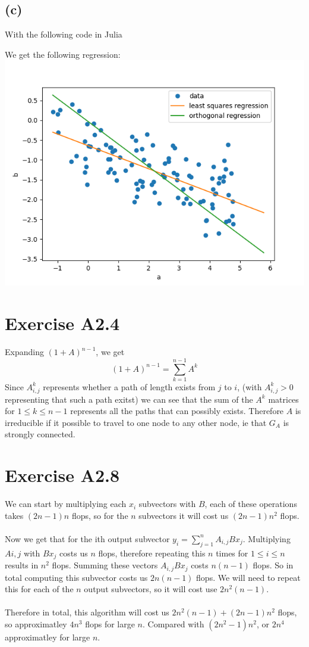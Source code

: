 \subsection*{(c)}
With the following code in Julia 

We get the following regression:\\
\includegraphics[scale=0.5]{test.png}
\section*{Exercise A2.4}
Expanding $(1+A)^{n-1}$, we get
$$
(1+A)^{n-1}=\sum_{k=1}^{n-1}A^k$$
Since $A^k_{i,j}$ represents whether a path of length exists from $j$ to $i$, (with $A^k_{i,j}>0$ representing that such a path exitst)
we can see that the sum of the $A^k$ matrices for $1\leq k \leq n-1$ represents all the paths that can possibly exists. Therefore $A$ is
irreducible if it possible to travel to one node to any other node, ie that $G_A$ is strongly connected.
\section*{Exercise A2.8}
We can start by multiplying each $x_i$ subvectors with $B$, each of these operations takes $(2n-1)n$ flops, so for the $n$ subvectors it will cost us $(2n-1)n^2$ flops.
\\\\Now we get that for the ith output subvector $y_i=\sum_{j=1}^{n}A_{i,j}Bx_j$. Multiplying $A{i,j}$ with $Bx_j$ costs us $n$ flops, therefore repeating this $n$ times for 
$1\leq i \leq n$ results in $n^2$ flops. Summing these vectors $A_{i,j}Bx_j$ costs $n(n-1)$ flops. So in total computing this subvector costs us $2n(n-1)$ flops. We will need to repeat this for each of the $n$ output subvectors, so it will cost use $2n^2(n-1)$.\\\\
Therefore in total, this algorithm will cost us $2n^2(n-1)+(2n-1)n^2$ flops, so approximatley $4n^3$ flops for large $n$. Compared with $(2n^2-1)n^2$, or $2n^4$ approximatley for large $n$.
